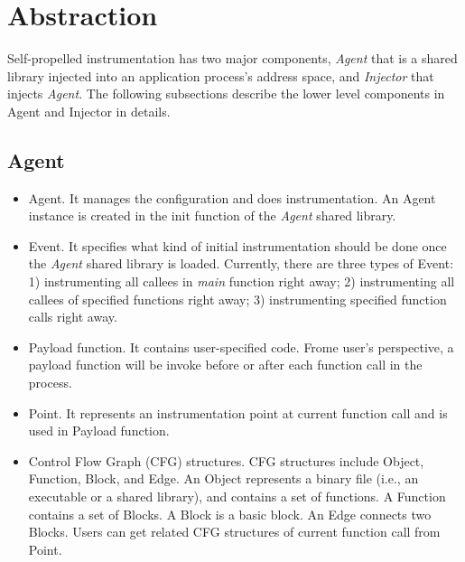 \section{Abstraction}
Self-propelled instrumentation has two major components, {\em Agent} that is a
shared library injected into an application process's address space, and {\em
  Injector} that injects {\em Agent}.
The following subsections describe the lower level components in Agent and
Injector in details.

\subsection{Agent}

\begin{itemize}
\item Agent. It manages the configuration and does instrumentation. An Agent
  instance is created in the init function of the {\em Agent} shared library.
\item Event. It specifies what kind of initial instrumentation should be done
  once the {\em Agent} shared library is loaded. 
  Currently, there are three types of Event: 1) instrumenting all callees in {\em
  main} function right away; 2) instrumenting all callees of specified functions
  right away; 3) instrumenting specified function calls right away.
\item Payload function. It contains user-specified code. 
  Frome user's perspective, a payload function will be invoke before or after each
  function call in the process.
\item Point. It represents an instrumentation point at current function call and
  is used in Payload function.
\item Control Flow Graph (CFG) structures. CFG structures include Object,
  Function, Block, and Edge. An Object represents a binary file (i.e., an
  executable or a shared library), and contains a set of functions. A Function
  contains a set of Blocks. A Block is a basic block. An Edge connects two
  Blocks. Users can get related CFG structures of current function call from
  Point.


\end{itemize}
